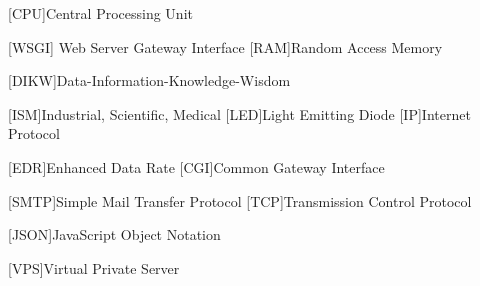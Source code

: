 \begin{acronym}[RELAX NG]
	[CPU]{Central Processing Unit}
	
	[WSGI]{ Web Server Gateway Interface }
	[RAM]{Random Access Memory}
	
	[DIKW]{Data-Information-Knowledge-Wisdom}
	
	[ISM]{Industrial, Scientific, Medical}
	[LED]{Light Emitting Diode}
	[IP]{Internet Protocol}
	
	[EDR]{Enhanced Data Rate}
	[CGI]{Common Gateway Interface}
	
	[SMTP]{Simple Mail Transfer Protocol}
	[TCP]{Transmission Control Protocol}
	
	[JSON]{JavaScript Object Notation}
	
	[VPS]{Virtual Private Server }
	
\end{acronym}